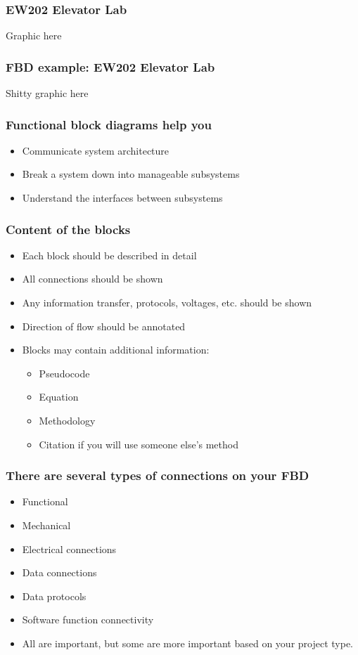 \documentclass[aspectratio=169]{beamer}
\begin{document}
\begin{frame}
\frametitle{EW202 Elevator Lab}
Graphic here
\end{frame}

\begin{frame}
\frametitle{FBD example: EW202 Elevator Lab}
Shitty graphic here
\end{frame}





\begin{frame}
\frametitle{Functional block diagrams help you}
\begin{itemize}
\item Communicate system architecture
\item Break a system down into manageable subsystems
\item Understand the interfaces between subsystems
\end{itemize}
\end{frame}

\begin{frame}
\frametitle{Content of the blocks}
\begin{itemize}
\item Each block should be described in detail
\item All connections should be shown
\item Any information transfer, protocols, voltages, etc. should be shown
\item Direction of flow should be annotated
\item Blocks may contain additional information:
\begin{itemize}
\item Pseudocode
\item Equation
\item Methodology
\item Citation if you will use someone else's method
\end{itemize}
\end{itemize}
\end{frame}

\begin{frame}
\frametitle{There are several types of connections on your FBD}
\begin{itemize}
\item Functional
\item Mechanical
\item Electrical connections
\item Data connections
\item Data protocols
\item Software function connectivity
\item All are important, but some are more important based on your project type.
\end{itemize}
\end{frame}
\end{document}
